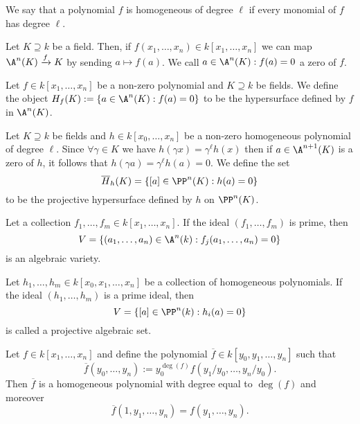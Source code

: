 \begin{definition}
   We say that a polynomial \(f\) is homogeneous of degree \(\ell\) if every
   monomial of \(f\) has degree \(\ell\). 
\end{definition}

Let \(K \supseteq k\) be a field. Then, if \(f(x_1, \dots, x_n) \in k[x_1, \dots,
x_n]\) we can map \(\A^n(K) \xrightarrow{f} K\) by sending \(a \mapsto f(a)\).
We call \(a \in \A^n(K) : f(a) = 0\) a zero of \(f\).

\begin{definition}[Hypersurface]
   Let \(f \in k[x_1, \dots, x_n]\) be a non-zero polynomial and \(K \supseteq
   k\) be fields. We define the object \(H_f(K) := \{a \in \A^n(K) : f(a) = 0\}
   \) to be the hypersurface defined by \(f\) in \(\A^n(K)\).
\end{definition}

\begin{definition}
   Let \(K \supseteq k\) be fields and \(h \in k[x_0, \dots, x_n]\) be a non-zero
   homogeneous polynomial of degree \(\ell\). Since \(\forall \gamma \in K\) we
   have \(h(\gamma x) = \gamma^\ell h(x)\) then if \(a \in \A^{n+1}(K)\) is a
   zero of \(h\), it follows that \(h(\gamma a) = \gamma^\ell h(a) = 0\). We
   define the set
    \[
       \overline{H}_h(K) = \{[a] \in \PP^n(K) : h(a) = 0\} 
   \] 
   to be the projective hypersurface defined by \(h\) on \(\PP^n(K)\).
\end{definition}

\begin{definition}
   Let a collection \(f_1, \dots, f_m \in k[x_1, \dots, x_n]\). If the ideal
   \((f_1, \dots, f_m)\) is prime, then
    \[
       V = \{(a_1, \dots, a_n) \in \A^n(k) :f_j(a_1, \dots, a_n) = 0\} 
   \] 
   is an algebraic variety.
\end{definition}

\begin{definition}
   Let \(h_1, \dots, h_m \in k[x_0, x_1, \dots, x_n]\) be a collection of
   homogeneous polynomials. If the ideal \((h_1,\dots,h_m)\) is a prime ideal,
   then
    \[
       V = \{[a] \in \PP^{n}(k) : h_i(a) = 0\} 
   \] 
   is called a projective algebraic set.
\end{definition}

\begin{proposition}[Homogenization]
   Let \(f \in k[x_1, \dots, x_n]\) and define the polynomial \(\overline{f} \in
   k[y_0, y_1,\dots,y_n]\) such that
   \[
      \overline{f}(y_0, \dots, y_n) := y_0^{\deg(f)} f\left( y_1/y_0, \dots,
      y_n/y_0 \right).
   \] 
   Then \(\overline{f}\) is a homogeneous polynomial with degree equal to
   \(\deg(f)\) and moreover \[\overline{f}(1, y_1, \dots, y_n) = f(y_1, \dots,
   y_n).\]
\end{proposition}

